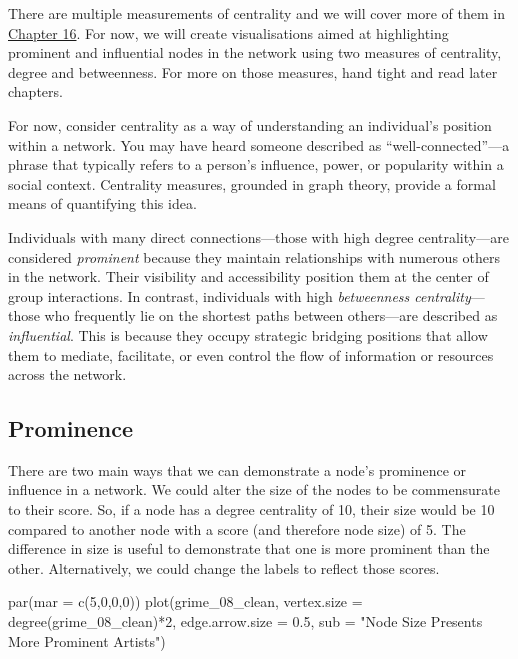 \documentclass[
  letterpaper,
  DIV=11,
  numbers=noendperiod]{scrreprt}
\newenvironment{Shaded}{\begin{snugshade}}{\end{snugshade}}
\newcommand{\AttributeTok}[1]{\textcolor[rgb]{0.40,0.45,0.13}{#1}}
\newcommand{\DecValTok}[1]{\textcolor[rgb]{0.68,0.00,0.00}{#1}}
\newcommand{\FloatTok}[1]{\textcolor[rgb]{0.68,0.00,0.00}{#1}}
\newcommand{\FunctionTok}[1]{\textcolor[rgb]{0.28,0.35,0.67}{#1}}
\newcommand{\NormalTok}[1]{\textcolor[rgb]{0.00,0.23,0.31}{#1}}
\newcommand{\SpecialCharTok}[1]{\textcolor[rgb]{0.37,0.37,0.37}{#1}}
\newcommand{\StringTok}[1]{\textcolor[rgb]{0.13,0.47,0.30}{#1}}
\begin{document}
There are multiple measurements of centrality and we will cover more of
them in \href{People\%20In\%20Networks.qmd}{Chapter 16}. For now, we
will create visualisations aimed at highlighting prominent and
influential nodes in the network using two measures of centrality,
degree and betweenness. For more on those measures, hand tight and read
later chapters.

For now, consider centrality as a way of understanding an individual's
position within a network. You may have heard someone described as
``well-connected''---a phrase that typically refers to a person's
influence, power, or popularity within a social context. Centrality
measures, grounded in graph theory, provide a formal means of
quantifying this idea.

Individuals with many direct connections---those with high degree
centrality---are considered \emph{prominent} because they maintain
relationships with numerous others in the network. Their visibility and
accessibility position them at the center of group interactions. In
contrast, individuals with high \emph{betweenness centrality}---those
who frequently lie on the shortest paths between others---are described
as \emph{influential}. This is because they occupy strategic bridging
positions that allow them to mediate, facilitate, or even control the
flow of information or resources across the network.

\subsection{Prominence}\label{prominence}

There are two main ways that we can demonstrate a node's prominence or
influence in a network. We could alter the size of the nodes to be
commensurate to their score. So, if a node has a degree centrality of
10, their size would be 10 compared to another node with a score (and
therefore node size) of 5. The difference in size is useful to
demonstrate that one is more prominent than the other. Alternatively, we
could change the labels to reflect those scores.

\begin{Shaded}
\begin{Highlighting}[]
\FunctionTok{par}\NormalTok{(}\AttributeTok{mar =} \FunctionTok{c}\NormalTok{(}\DecValTok{5}\NormalTok{,}\DecValTok{0}\NormalTok{,}\DecValTok{0}\NormalTok{,}\DecValTok{0}\NormalTok{))}
\FunctionTok{plot}\NormalTok{(grime\_08\_clean, }\AttributeTok{vertex.size =} \FunctionTok{degree}\NormalTok{(grime\_08\_clean)}\SpecialCharTok{*}\DecValTok{2}\NormalTok{, }\AttributeTok{edge.arrow.size =} \FloatTok{0.5}\NormalTok{, }\AttributeTok{sub =} \StringTok{"Node Size Presents More Prominent Artists"}\NormalTok{)}
\end{Highlighting}
\end{Shaded}
\end{document}
